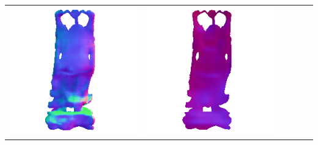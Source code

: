 \begin{tabularx}{\linewidth}{@{}Y@{}Y@{}Y@{}Y@{}Y@{}Y@{}}
\includegraphics[width=\linewidth]{semisynthetic/20150514_20_marrnet_out.png} &
\includegraphics[width=\linewidth]{semisynthetic/20150514_20_ef_out.png} \\

\end{tabularx}
